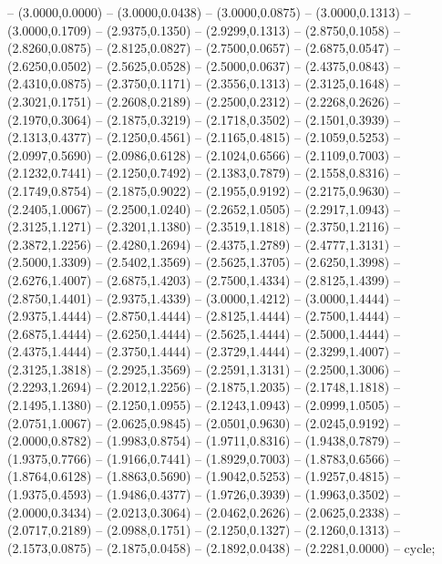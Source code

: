 {-- (3.0000,0.0000) -- (3.0000,0.0438) -- (3.0000,0.0875) -- (3.0000,0.1313) -- (3.0000,0.1709) -- (2.9375,0.1350) -- (2.9299,0.1313) -- (2.8750,0.1058) -- (2.8260,0.0875) -- (2.8125,0.0827) -- (2.7500,0.0657) -- (2.6875,0.0547) -- (2.6250,0.0502) -- (2.5625,0.0528) -- (2.5000,0.0637) -- (2.4375,0.0843) -- (2.4310,0.0875) -- (2.3750,0.1171) -- (2.3556,0.1313) -- (2.3125,0.1648) -- (2.3021,0.1751) -- (2.2608,0.2189) -- (2.2500,0.2312) -- (2.2268,0.2626) -- (2.1970,0.3064) -- (2.1875,0.3219) -- (2.1718,0.3502) -- (2.1501,0.3939) -- (2.1313,0.4377) -- (2.1250,0.4561) -- (2.1165,0.4815) -- (2.1059,0.5253) -- (2.0997,0.5690) -- (2.0986,0.6128) -- (2.1024,0.6566) -- (2.1109,0.7003) -- (2.1232,0.7441) -- (2.1250,0.7492) -- (2.1383,0.7879) -- (2.1558,0.8316) -- (2.1749,0.8754) -- (2.1875,0.9022) -- (2.1955,0.9192) -- (2.2175,0.9630) -- (2.2405,1.0067) -- (2.2500,1.0240) -- (2.2652,1.0505) -- (2.2917,1.0943) -- (2.3125,1.1271) -- (2.3201,1.1380) -- (2.3519,1.1818) -- (2.3750,1.2116) -- (2.3872,1.2256) -- (2.4280,1.2694) -- (2.4375,1.2789) -- (2.4777,1.3131) -- (2.5000,1.3309) -- (2.5402,1.3569) -- (2.5625,1.3705) -- (2.6250,1.3998) -- (2.6276,1.4007) -- (2.6875,1.4203) -- (2.7500,1.4334) -- (2.8125,1.4399) -- (2.8750,1.4401) -- (2.9375,1.4339) -- (3.0000,1.4212) -- (3.0000,1.4444) -- (2.9375,1.4444) -- (2.8750,1.4444) -- (2.8125,1.4444) -- (2.7500,1.4444) -- (2.6875,1.4444) -- (2.6250,1.4444) -- (2.5625,1.4444) -- (2.5000,1.4444) -- (2.4375,1.4444) -- (2.3750,1.4444) -- (2.3729,1.4444) -- (2.3299,1.4007) -- (2.3125,1.3818) -- (2.2925,1.3569) -- (2.2591,1.3131) -- (2.2500,1.3006) -- (2.2293,1.2694) -- (2.2012,1.2256) -- (2.1875,1.2035) -- (2.1748,1.1818) -- (2.1495,1.1380) -- (2.1250,1.0955) -- (2.1243,1.0943) -- (2.0999,1.0505) -- (2.0751,1.0067) -- (2.0625,0.9845) -- (2.0501,0.9630) -- (2.0245,0.9192) -- (2.0000,0.8782) -- (1.9983,0.8754) -- (1.9711,0.8316) -- (1.9438,0.7879) -- (1.9375,0.7766) -- (1.9166,0.7441) -- (1.8929,0.7003) -- (1.8783,0.6566) -- (1.8764,0.6128) -- (1.8863,0.5690) -- (1.9042,0.5253) -- (1.9257,0.4815) -- (1.9375,0.4593) -- (1.9486,0.4377) -- (1.9726,0.3939) -- (1.9963,0.3502) -- (2.0000,0.3434) -- (2.0213,0.3064) -- (2.0462,0.2626) -- (2.0625,0.2338) -- (2.0717,0.2189) -- (2.0988,0.1751) -- (2.1250,0.1327) -- (2.1260,0.1313) -- (2.1573,0.0875) -- (2.1875,0.0458) -- (2.1892,0.0438) -- (2.2281,0.0000) -- cycle;
}
